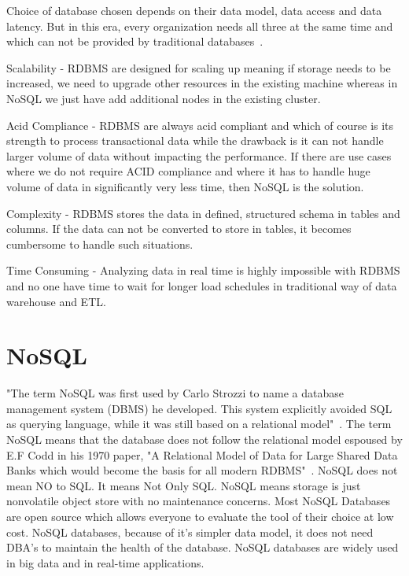 Choice of database chosen depends on their data model, data access and 
data latency. But in this era, every organization needs all three 
at the same time and which can not be provided by traditional 
databases~\cite{hid-sp18-710-vish}.

Scalability - RDBMS are designed for scaling up meaning if storage needs
to be increased, we need to upgrade other resources in the existing 
machine whereas in NoSQL we just have add additional nodes in the
existing cluster. 

Acid Compliance - RDBMS are always acid compliant and which of course is
its strength to process transactional data while the drawback is it can
not handle larger volume of data without impacting the performance. If
there are use cases where we do not require ACID compliance and  where
it has to handle huge volume of data in significantly very less time, 
then NoSQL is the solution.

Complexity - RDBMS stores the data in defined, structured schema in
tables and columns. If the data can not be converted to store in tables,
it becomes cumbersome to handle such situations. 

Time Consuming - Analyzing data in real time is highly impossible with
RDBMS and no one have time to wait for longer load schedules in 
traditional way of data warehouse and ETL.

\section{NoSQL}

"The term NoSQL was first used by Carlo Strozzi to name a database
management system (DBMS) he developed. This system explicitly 
avoided SQL as querying language, while it was still based on a
relational model"~\cite{hid-sp18-710-seasupenn}. The term NoSQL means that
the database does not follow the relational model espoused by 
E.F Codd in his 1970 paper, "A Relational Model of Data for Large
Shared Data Banks which would become the basis for all modern 
RDBMS"~\cite{hid-sp18-710-rdbms}. NoSQL does not mean NO to SQL. 
It means Not Only SQL. NoSQL means storage is just nonvolatile 
object store with no maintenance concerns. Most NoSQL Databases
are open source which allows everyone to evaluate the tool of their 
choice at low cost. NoSQL databases, because of it's simpler 
data model, it does not need DBA's to maintain the health of 
the database. NoSQL databases are widely used in big data 
and in real-time applications.  

